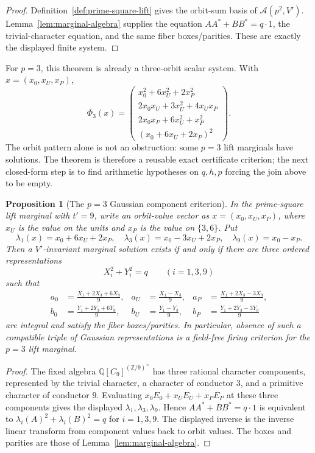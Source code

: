 \documentclass[11pt]{article}
\theoremstyle{plain}
\newtheorem{proposition}[theorem]{Proposition}
\theoremstyle{definition}
\theoremstyle{remark}
\newcommand{\Z}{\mathbb Z}
\newcommand{\Q}{\mathbb Q}
\begin{document}
\begin{proof}
Definition~\ref{def:prime-square-lift} gives the orbit-sum basis of
$\mathcal A(p^2,V')$. Lemma~\ref{lem:marginal-algebra} supplies the equation
$AA^*+BB^*=q\cdot1$, the trivial-character equation, and the same fiber
boxes/parities. These are exactly the displayed finite system.
\end{proof}

For $p=3$, this theorem is already a three-orbit scalar system. With
$x=(x_0,x_U,x_P)$,
\[
  \Phi_3(x)=
  \begin{pmatrix}
  x_0^2+6x_U^2+2x_P^2\\
  2x_0x_U+3x_U^2+4x_Ux_P\\
  2x_0x_P+6x_U^2+x_P^2\\
  (x_0+6x_U+2x_P)^2
  \end{pmatrix}.
\]
The orbit pattern alone is not an obstruction: some $p=3$ lift marginals have
solutions. The theorem is therefore a reusable exact certificate criterion; the
next closed-form step is to find arithmetic hypotheses on $q,h,p$ forcing the
join above to be empty.

\begin{proposition}[The $p=3$ Gaussian component criterion]\label{prop:p3-gaussian}
In the prime-square lift marginal with $t'=9$, write an orbit-value vector as
$x=(x_0,x_U,x_P)$, where $x_U$ is the value on the units and $x_P$ is the value
on $\{3,6\}$. Put
\[
  \lambda_1(x)=x_0+6x_U+2x_P,\quad
  \lambda_3(x)=x_0-3x_U+2x_P,\quad
  \lambda_9(x)=x_0-x_P .
\]
Then a $V'$-invariant marginal solution exists if and only if there are three
ordered representations
\[
  X_i^2+Y_i^2=q\qquad (i=1,3,9)
\]
such that
\[
\begin{aligned}
a_0&=\frac{X_1+2X_3+6X_9}{9},&
a_U&=\frac{X_1-X_3}{9},&
a_P&=\frac{X_1+2X_3-3X_9}{9},\\
b_0&=\frac{Y_1+2Y_3+6Y_9}{9},&
b_U&=\frac{Y_1-Y_3}{9},&
b_P&=\frac{Y_1+2Y_3-3Y_9}{9}
\end{aligned}
\]
are integral and satisfy the fiber boxes/parities. In particular, absence of
such a compatible triple of Gaussian representations is a field-free firing
criterion for the $p=3$ lift marginal.
\end{proposition}

\begin{proof}
The fixed algebra $\Q[C_9]^{(\Z/9)^\times}$ has three rational character
components, represented by the trivial character, a character of conductor $3$,
and a primitive character of conductor $9$. Evaluating
$x_0E_0+x_UE_U+x_PE_P$ at these three components gives the displayed
$\lambda_1,\lambda_3,\lambda_9$. Hence $AA^*+BB^*=q\cdot1$ is equivalent to
$\lambda_i(A)^2+\lambda_i(B)^2=q$ for $i=1,3,9$. The displayed inverse is the
inverse linear transform from component values back to orbit values. The boxes
and parities are those of Lemma~\ref{lem:marginal-algebra}.
\end{proof}
\end{document}
